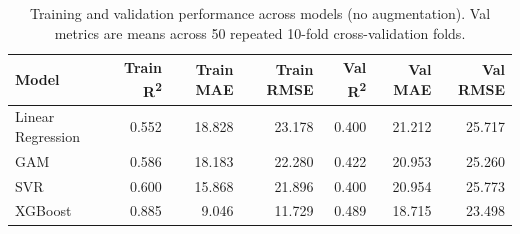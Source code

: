 
\begin{table}
    \caption{Training and validation performance across models (no augmentation).
             Val metrics are means across 50 repeated 10-fold cross-validation folds.}
    \label{tab:model_performance_trainval}
    \centering
    \small
    \begin{tabular}{lrrrrrr}
        \toprule
        Model & Train R\textsuperscript{2} & Train MAE & Train RMSE & Val R\textsuperscript{2} & Val MAE & Val RMSE \\
        \midrule
        Linear Regression & 0.552 & 18.828 & 23.178 & 0.400 & 21.212 & 25.717 \\
        GAM & 0.586 & 18.183 & 22.280 & 0.422 & 20.953 & 25.260 \\
        SVR & 0.600 & 15.868 & 21.896 & 0.400 & 20.954 & 25.773 \\
        XGBoost & 0.885 & 9.046 & 11.729 & 0.489 & 18.715 & 23.498 \\
        \bottomrule
    \end{tabular}
\end{table}
